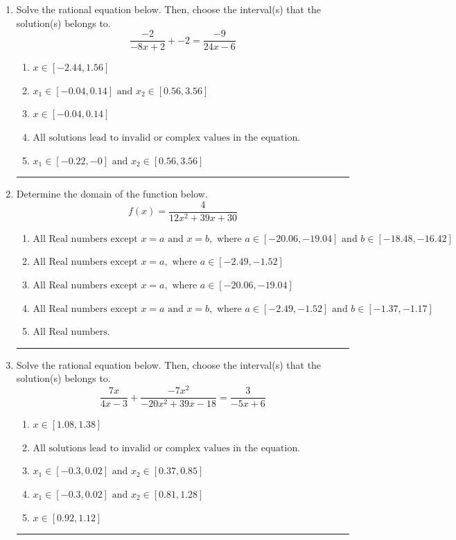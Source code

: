 \documentclass[14pt]{extbook}
\newcommand{\litem}[1]{\item#1\hspace*{-1cm}\rule{\textwidth}{0.4pt}}
\begin{document}
\begin{enumerate}
{\begin{enumerate}[label=\Alph*.]
\end{enumerate} }
\litem{
Solve the rational equation below. Then, choose the interval(s) that the solution(s) belongs to.\[ \frac{-2}{-8x + 2} + -2 = \frac{-9}{24x -6} \]\begin{enumerate}[label=\Alph*.]
\item \( x \in [-2.44,1.56] \)
\item \( x_1 \in [-0.04, 0.14] \text{ and } x_2 \in [0.56,3.56] \)
\item \( x \in [-0.04,0.14] \)
\item \( \text{All solutions lead to invalid or complex values in the equation.} \)
\item \( x_1 \in [-0.22, -0] \text{ and } x_2 \in [0.56,3.56] \)

\end{enumerate} }
\litem{
Determine the domain of the function below.\[ f(x) = \frac{4}{12x^{2} +39 x + 30} \]\begin{enumerate}[label=\Alph*.]
\item \( \text{All Real numbers except } x = a \text{ and } x = b, \text{ where } a \in [-20.06, -19.04] \text{ and } b \in [-18.48, -16.42] \)
\item \( \text{All Real numbers except } x = a, \text{ where } a \in [-2.49, -1.52] \)
\item \( \text{All Real numbers except } x = a, \text{ where } a \in [-20.06, -19.04] \)
\item \( \text{All Real numbers except } x = a \text{ and } x = b, \text{ where } a \in [-2.49, -1.52] \text{ and } b \in [-1.37, -1.17] \)
\item \( \text{All Real numbers.} \)

\end{enumerate} }
\litem{
Solve the rational equation below. Then, choose the interval(s) that the solution(s) belongs to.\[ \frac{7x}{4x -3} + \frac{-7x^{2}}{-20x^{2} +39 x -18} = \frac{3}{-5x + 6} \]\begin{enumerate}[label=\Alph*.]
\item \( x \in [1.08,1.38] \)
\item \( \text{All solutions lead to invalid or complex values in the equation.} \)
\item \( x_1 \in [-0.3, 0.02] \text{ and } x_2 \in [0.37,0.85] \)
\item \( x_1 \in [-0.3, 0.02] \text{ and } x_2 \in [0.81,1.28] \)
\item \( x \in [0.92,1.12] \)


\end{enumerate}}
\end{enumerate}
\end{document}
